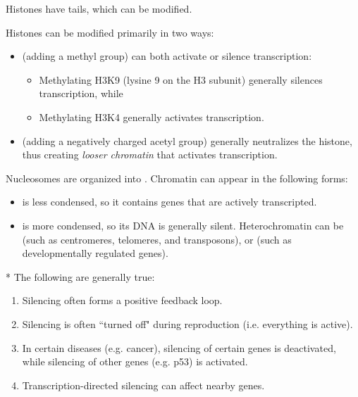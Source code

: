 \begin{fact}
	Histones have tails, which can be modified. 
\end{fact}

\begin{defn}
	Histones can be modified primarily in two ways:
	\begin{itemize}
		\item {} (adding a methyl group) can both activate or silence transcription:
			\begin{itemize}
				\item Methylating H3K9 (lysine 9 on the H3 subunit) generally silences transcription, while
				\item Methylating H3K4 generally activates transcription.
			\end{itemize}
		\item {} (adding a negatively charged acetyl group) generally neutralizes the histone, thus creating \emph{looser chromatin} that activates transcription.
	\end{itemize}
\end{defn}

\begin{defn}
	Nucleosomes are organized into .
	Chromatin can appear in the following forms:
	\begin{itemize}
		\item {} is less condensed, so it contains genes that are actively transcripted.
		\item {} is more condensed, so its DNA is generally silent. Heterochromatin can be  (such as centromeres, telomeres, and transposons), or  (such as developmentally regulated genes).
	\end{itemize}
\end{defn}

\begin{fact}*
	The following are generally true:
	\begin{enumerate}
		\item Silencing often forms a positive feedback loop.
		\item Silencing is often ``turned off" during reproduction (i.e. everything is active).
		\item In certain diseases (e.g. cancer), silencing of certain genes is deactivated, while silencing of other genes (e.g. p53) is activated.
		\item Transcription-directed silencing can affect nearby genes.
	\end{enumerate}
\end{fact}	

